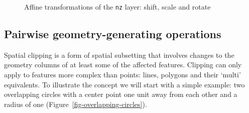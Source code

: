 \documentclass[
  letterpaper,
]{krantz}
\begin{document}
\begin{figure}

\begin{minipage}{0.33\linewidth}



\end{minipage}%
%
\begin{minipage}{0.33\linewidth}



\end{minipage}%
%
\begin{minipage}{0.33\linewidth}



\end{minipage}%

\caption{\label{fig-affine-transformations}Affine transformations of the
\texttt{nz} layer: shift, scale and rotate}

\end{figure}%

\subsection{Pairwise geometry-generating operations}\label{sec-clipping}

Spatial clipping is a form of spatial subsetting that involves changes
to the geometry columns of at least some of the affected features.
Clipping can only apply to features more complex than points: lines,
polygons and their `multi' equivalents. To illustrate the concept we
will start with a simple example: two overlapping circles with a center
point one unit away from each other and a radius of one
(Figure~\ref{fig-overlapping-circles}).
\end{document}

